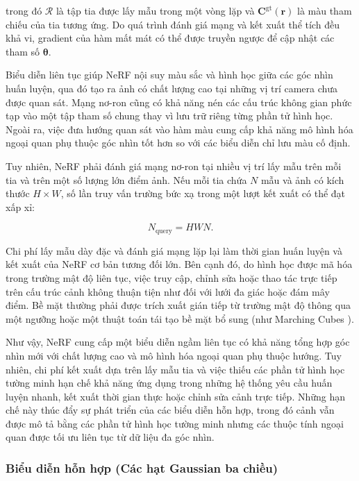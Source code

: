 trong đó $\mathcal{R}$ là tập tia được lấy mẫu trong một vòng lặp và $\mathbf{C}^{\mathrm{gt}}(\mathbf{r})$ là màu tham chiếu của tia tương ứng. Do quá trình đánh giá mạng và kết xuất thể tích đều khả vi, gradient của hàm mất mát có thể được truyền ngược để cập nhật các tham số $\boldsymbol{\theta}$.

Biểu diễn liên tục giúp NeRF nội suy màu sắc và hình học giữa các góc nhìn huấn luyện, qua đó tạo ra ảnh có chất lượng cao tại những vị trí camera chưa được quan sát. Mạng nơ-ron cũng có khả năng nén các cấu trúc không gian phức tạp vào một tập tham số chung thay vì lưu trữ riêng từng phần tử hình học. Ngoài ra, việc đưa hướng quan sát vào hàm màu cung cấp khả năng mô hình hóa ngoại quan phụ thuộc góc nhìn tốt hơn so với các biểu diễn chỉ lưu màu cố định.

Tuy nhiên, NeRF phải đánh giá mạng nơ-ron tại nhiều vị trí lấy mẫu trên mỗi tia và trên một số lượng lớn điểm ảnh. Nếu mỗi tia chứa $N$ mẫu và ảnh có kích thước $H\times W$, số lần truy vấn trường bức xạ trong một lượt kết xuất có thể đạt xấp xỉ:

\begin{equation}
    N_{\mathrm{query}}
    =
    H
    W
    N.
    \label{eq:nerf-number-of-network-queries}
\end{equation}

Chi phí lấy mẫu dày đặc và đánh giá mạng lặp lại làm thời gian huấn luyện và kết xuất của NeRF cơ bản tương đối lớn. Bên cạnh đó, do hình học được mã hóa trong trường mật độ liên tục, việc truy cập, chỉnh sửa hoặc thao tác trực tiếp trên cấu trúc cảnh không thuận tiện như đối với lưới đa giác hoặc đám mây điểm. Bề mặt thường phải được trích xuất gián tiếp từ trường mật độ thông qua một ngưỡng hoặc một thuật toán tái tạo bề mặt bổ sung (như Marching Cubes \cite{lorensen1987marching}).

Như vậy, NeRF cung cấp một biểu diễn ngầm liên tục có khả năng tổng hợp góc nhìn mới với chất lượng cao và mô hình hóa ngoại quan phụ thuộc hướng. Tuy nhiên, chi phí kết xuất dựa trên lấy mẫu tia và việc thiếu các phần tử hình học tường minh hạn chế khả năng ứng dụng trong những hệ thống yêu cầu huấn luyện nhanh, kết xuất thời gian thực hoặc chỉnh sửa cảnh trực tiếp. Những hạn chế này thúc đẩy sự phát triển của các biểu diễn hỗn hợp, trong đó cảnh vẫn được mô tả bằng các phần tử hình học tường minh nhưng các thuộc tính ngoại quan được tối ưu liên tục từ dữ liệu đa góc nhìn.

\subsubsection{Biểu diễn hỗn hợp (Các hạt Gaussian ba chiều)}
\label{subsubsec:hybrid-gaussian-representation}

